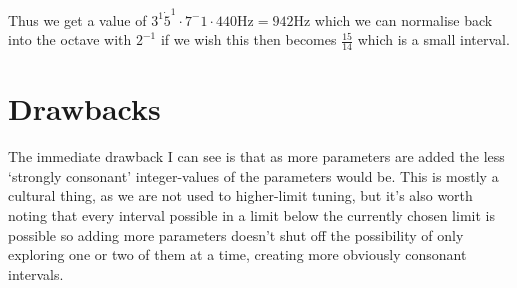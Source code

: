 Thus we get a value of $3^1 \dot 5^1 \cdot 7^-1 \cdot 440\si{\hertz} = 942\si{\hertz}$ which we can
normalise back into the octave with $2^{-1}$ if we wish this then becomes $\frac{15}{14}$ which is
a small interval.

\section{Drawbacks}
The immediate drawback I can see is that as more parameters are added the less `strongly consonant'
integer-values of the parameters would be. This is mostly a cultural thing, as we are not used to
higher-limit tuning, but it's also worth noting that every interval possible in a limit below the
currently chosen limit is possible so adding more parameters doesn't shut off the possibility of
only exploring one or two of them at a time, creating more obviously consonant intervals.
